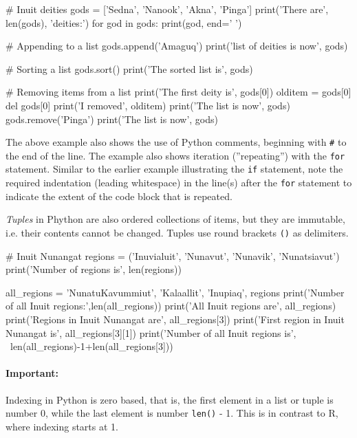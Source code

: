 \begin{samepage}
\begin{pythoncode}
# Inuit deities
gods = ['Sedna', 'Nanook', 'Akna', 'Pinga']
print('There are', len(gods), 'deities:')
for god in gods:
    print(god, end=' ')

# Appending to a list
gods.append('Amaguq')
print('\nThe list of deities is now', gods)

# Sorting a list
gods.sort()
print('The sorted list is', gods)

# Removing items from a list
print('The first deity is', gods[0])
olditem = gods[0]
del gods[0]
print('I removed', olditem)
print('The list is now', gods)
gods.remove('Pinga')
print('The list is now', gods)
\end{pythoncode}
\end{samepage}

\noindent The above example also shows the use of Python comments, beginning with \texttt{\#} to the end of the line. The example also shows iteration (''repeating'') with the \texttt{for} statement. Similar to the earlier example illustrating the \texttt{if} statement, note the required indentation (leading whitespace) in the line(s) after the \texttt{for} statement to indicate the extent of the code block that is repeated.

\emph{Tuples} in Phython are also ordered collections of items, but they are immutable, i.e. their contents cannot be changed. Tuples use round brackets \texttt{()} as delimiters.

\begin{samepage}
\begin{pythoncode}
# Inuit Nunangat
regions = ('Inuvialuit', 'Nunavut', 'Nunavik', 'Nunatsiavut')
print('Number of regions is', len(regions))

all_regions = 'NunatuKavummiut', 'Kalaallit', 'Inupiaq', regions
print('Number of all Inuit regions:',len(all_regions))
print('All Inuit regions are', all_regions)
print('Regions in Inuit Nunangat are', all_regions[3])
print('First region in Inuit Nunangat is', all_regions[3][1])
print('Number of all Inuit regions is', \
    len(all_regions)-1+len(all_regions[3]))
\end{pythoncode}
\end{samepage}

\begin{tcolorbox}[colback=alert]
\paragraph*{Important:} Indexing in Python is zero based, that is, the first element in a list or tuple is number 0, while the last element is number \texttt{len()} - 1. This is in contrast to R, where indexing starts at 1.
\end{tcolorbox}

